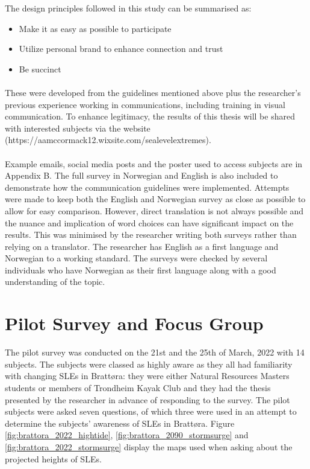 The design principles followed in this study can be summarised as:
\begin{itemize}
    \item Make it as easy as possible to participate
    \item Utilize personal brand to enhance connection and trust
    \item Be succinct
\end{itemize}
\paragraph{}
These were developed from the guidelines mentioned above plus the researcher's previous experience working in communications, including training in visual communication. To enhance legitimacy, the results of this thesis will be shared with interested subjects via the website (https://aamccormack12.wixsite.com/sealevelextremes).
\paragraph{}
Example emails, social media posts and the poster used to access subjects are in Appendix B. The full survey in Norwegian and English is also included to demonstrate how the communication guidelines were implemented. Attempts were made to keep both the English and Norwegian survey as close as possible to allow for easy comparison. However, direct translation is not always possible and the nuance and implication of word choices can have significant impact on the results. This was minimised by the researcher writing both surveys rather than relying on a translator. The researcher has English as a first language and Norwegian to a working standard. The surveys were checked by several individuals who have Norwegian as their first language along with a good understanding of the topic.


\section{Pilot Survey and Focus Group}\label{method-pilot}

The pilot survey was conducted on the 21st and the 25th of March, 2022 with 14 subjects. The subjects were classed as highly aware as they all had familiarity with changing SLEs in Brattøra: they were either Natural Resources Masters students or members of Trondheim Kayak Club and they had the thesis presented by the researcher in advance of responding to the survey. The pilot subjects were asked seven questions, of which three were used in an attempt to determine the subjects' awareness of SLEs in Brattøra. Figure \ref{fig:brattora_2022_hightide}, \ref{fig:brattora_2090_stormsurge} and \ref{fig:brattora_2022_stormsurge} display the maps used when asking about the projected heights of SLEs.

